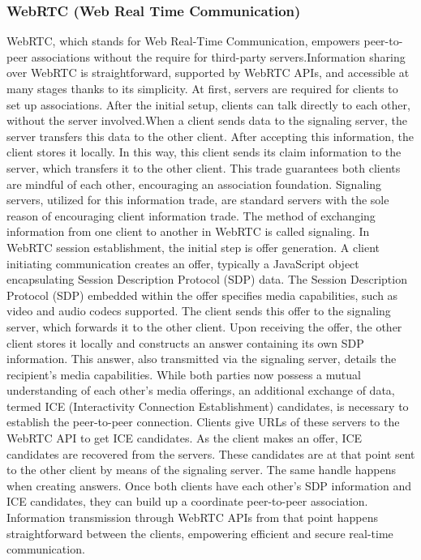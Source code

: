 \documentclass[a4paper,12pt]{article}  %
\begin{document}
\subsubsection{WebRTC (Web Real Time Communication)}
WebRTC, which stands for Web Real-Time Communication, empowers peer-to-peer
associations without the require for third-party servers.Information sharing
over WebRTC is straightforward, supported by WebRTC APIs, and accessible at
many stages thanks to its simplicity. At first, servers are required for
clients to set up associations. After the initial setup, clients can talk
directly to each other, without the server involved.When a client sends data to
the signaling server, the server transfers this data to the other client. After
accepting this information, the client stores it locally. In this way, this
client sends its claim information to the server, which transfers it to the
other client. This trade guarantees both clients are mindful of each other,
encouraging an association foundation. Signaling servers, utilized for this
information trade, are standard servers with the sole reason of encouraging
client information trade.\cite{emmanuel2022design} The method of exchanging information from one client
to another in WebRTC is called signaling. In WebRTC session establishment, the
initial step is offer generation. A client initiating communication creates an
offer, typically a JavaScript object encapsulating Session Description Protocol
(SDP) data. The Session Description Protocol (SDP) embedded within the offer
specifies media capabilities, such as video and audio codecs supported. The
client sends this offer to the signaling server, which forwards it to the other
client. Upon receiving the offer, the other client stores it locally and
constructs an answer containing its own SDP information. This answer, also
transmitted via the signaling server, details the recipient's media
capabilities. While both parties now possess a mutual understanding of each
other's media offerings, an additional exchange of data, termed ICE
(Interactivity Connection Establishment) candidates, is necessary to establish
the peer-to-peer connection. Clients give URLs of these servers to the WebRTC
API to get ICE candidates. As the client makes an offer, ICE candidates are
recovered from the servers. These candidates are at that point sent to the
other client by means of the signaling server. The same handle happens when
creating answers. Once both clients have each other's SDP information and ICE
candidates, they can build up a coordinate peer-to-peer association.
Information transmission through WebRTC APIs from that point happens
straightforward between the clients, empowering efficient and secure real-time
communication.\\
\end{document}
